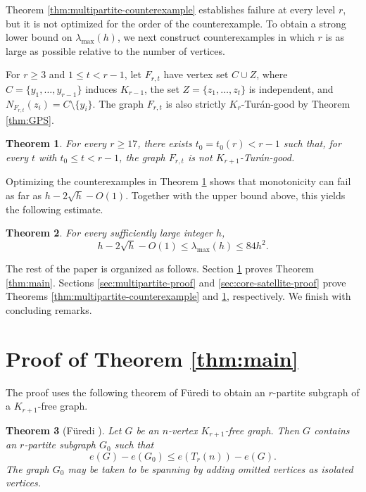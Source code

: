 \documentclass[11pt]{article}
\numberwithin{equation}{section}
\newtheorem{theorem}{Theorem}[section]
\theoremstyle{definition}
\theoremstyle{remark}
\begin{document}
Theorem \ref{thm:multipartite-counterexample} establishes failure at every level $r$, but it is not optimized for the order of the counterexample. To obtain a strong lower bound on $\lambda_{\max}(h)$, we next construct counterexamples in which $r$ is as large as possible relative to the number of vertices.

For $r\ge 3$ and $1\le t<r-1$, let $F_{r,t}$ have vertex set $C\cup Z$, where $C=\{y_1,\ldots,y_{r-1}\}$ induces $K_{r-1}$, the set $Z=\{z_1,\ldots,z_t\}$ is independent, and $N_{F_{r,t}}(z_i)=C\setminus\{y_i\}$.
The graph $F_{r,t}$ is also strictly $K_r$-Tur\'an-good by Theorem \ref{thm:GPS}.

\begin{theorem}
\label{thm:core-satellite}
For every $r\ge 17$, there exists $t_0=t_0(r)<r-1$ such that, for every $t$ with $t_0\le t<r-1$, the graph $F_{r,t}$ is not $K_{r+1}$-Tur\'an-good.
\end{theorem}

Optimizing the counterexamples in Theorem \ref{thm:core-satellite} shows that monotonicity can fail as far as $h-2\sqrt h-O(1)$. Together with the upper bound above, this yields the following estimate.

\begin{theorem}
\label{thm:threshold-range}
For every sufficiently large integer $h$,
\[
h-2\sqrt h-O(1)\le \lambda_{\max}(h)\le 84h^2.
\]
\end{theorem}

The rest of the paper is organized as follows. Section \ref{sec:main-proof} proves Theorem \ref{thm:main}. Sections \ref{sec:multipartite-proof} and \ref{sec:core-satellite-proof} prove Theorems \ref{thm:multipartite-counterexample} and \ref{thm:core-satellite}, respectively. We finish with concluding remarks.

\section{Proof of Theorem \ref{thm:main}}
\label{sec:main-proof}

The proof uses the following theorem of F\"uredi to obtain an $r$-partite subgraph of a $K_{r+1}$-free graph.

\begin{theorem}[F\"uredi \cite{Furedi}]
\label{thm:Furedi}
Let $G$ be an $n$-vertex $K_{r+1}$-free graph. Then $G$ contains an $r$-partite subgraph $G_0$ such that
\[
e(G)-e(G_0)\le e(T_r(n))-e(G).
\]
The graph $G_0$ may be taken to be spanning by adding omitted vertices as isolated vertices.
\end{theorem}
\end{document}
